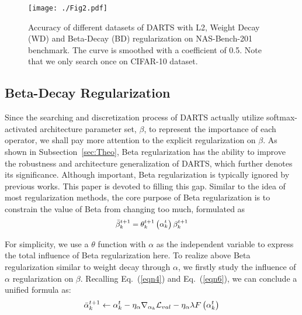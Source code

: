 \documentclass[10pt,twocolumn,letterpaper]{article}
\begin{document}
\begin{figure*}[t] 
	\centering
\texttt{[image: ./Fig2.pdf]}
\vspace{-12pt}
	\caption{Accuracy of different datasets
of DARTS with L2, Weight Decay (WD) and Beta-Decay (BD) regularization on NAS-Bench-201 benchmark. The curve is smoothed with a coefficient of 0.5. Note that we only search once on CIFAR-10 dataset.}
	\label{fig:3}
	\vspace{-10pt}	
\end{figure*}

\subsection{Beta-Decay Regularization}
Since the searching and discretization process of DARTS actually utilize softmax-activated architecture parameter set, $\beta$, to represent the importance of each operator, we shall pay more attention to the explicit regularization on $\beta$. 
As shown in Subsection~\ref{sec:Theo}, Beta regularization has the ability to improve the robustness and architecture generalization of DARTS, which further denotes its significance. Although important, Beta regularization is typically ignored by previous works. This paper is devoted to filling this gap. Similar to the idea of most regularization methods, the core purpose of Beta regularization is to constrain the value of Beta from changing too much, formulated as
\begin{equation} \label{eqn8}
\small
  \begin{split}
    \bar{\beta}_{k}^{t+1}=\theta_{k}^{t+1}\left(\alpha_k^t \right)\beta_{k}^{t+1}
  \end{split}
  \vspace{-6pt}
\end{equation}

For simplicity, we use a $\theta$ function with $\alpha$ as the independent variable to express the total influence of Beta regularization here. To realize above Beta regularization similar to weight decay through $\alpha$, we firstly study the influence of $\alpha$ regularization on $\beta$. Recalling Eq.~(\ref{eqn4}) and Eq.~(\ref{eqn6}), we can conclude a unified formula as: 
\begin{equation} \label{eqn19}
  \begin{split}
    \bar{\alpha}_{k}^{t+1} \leftarrow \alpha_{k}^{t}-\eta_{\alpha} \nabla_{\alpha_{k}} \mathcal{L}_{val}-\eta_{\alpha} \lambda F\left(\alpha_{k}^{t}\right)
  \end{split}
  \vspace{-6pt}
\end{equation}
\end{document}
